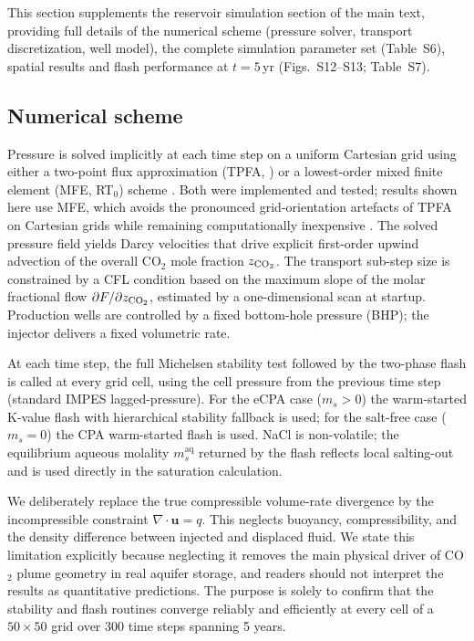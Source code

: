 \documentclass[preprint,12pt,number]{elsarticle}
\begin{document}
This section supplements the reservoir simulation section of the main text, providing full
details of the numerical scheme (pressure solver, transport discretization, well model),
the complete simulation parameter set (Table~S6), spatial results and flash performance
at $t = 5$\,yr (Figs.~S12--S13; Table~S7).

\subsection*{Numerical scheme}

Pressure is solved implicitly at each time step on a uniform Cartesian grid using either
a two-point flux approximation (TPFA, \citealt{Aavatsmark2003}) or a lowest-order
mixed finite element (MFE, RT$_0$) scheme \citep{chaventjaffre}.
Both were implemented and tested; results shown here use MFE, which avoids the
pronounced grid-orientation artefacts of TPFA on Cartesian grids while remaining
computationally inexpensive \citep{moortgat2011compositional,moortgat2013higher,moortgat2016mixed}.
The solved pressure field yields Darcy velocities that drive explicit first-order upwind
advection of the overall CO$_2$ mole fraction $z_{\rm CO_2}$.
The transport sub-step size is constrained by a CFL condition based on the maximum
slope of the molar fractional flow $\partial F / \partial z_{\rm CO_2}$, estimated by a
one-dimensional scan at startup.
Production wells are controlled by a fixed bottom-hole pressure (BHP); the injector
delivers a fixed volumetric rate.

At each time step, the full Michelsen stability test followed by the two-phase flash
is called at every grid cell, using the cell pressure from the previous time step
(standard IMPES lagged-pressure).
For the eCPA case ($m_s > 0$) the warm-started K-value flash with hierarchical stability
fallback is used; for the salt-free case ($m_s = 0$) the
CPA warm-started flash is used.
NaCl is non-volatile; the equilibrium aqueous molality $m_s^\mathrm{aq}$ returned by the
flash reflects local salting-out and is used directly in the saturation calculation.

We deliberately replace the true compressible volume-rate divergence by the
incompressible constraint $\nabla\cdot\mathbf{u} = q$.
This neglects buoyancy, compressibility, and the density difference between injected and
displaced fluid.
We state this limitation explicitly because neglecting it removes the main physical driver
of CO$_2$ plume geometry in real aquifer storage, and readers should not interpret the
results as quantitative predictions.
The purpose is solely to confirm that the stability and flash routines converge reliably
and efficiently at every cell of a $50{\times}50$ grid over 300 time steps spanning
5 years.
\end{document}
